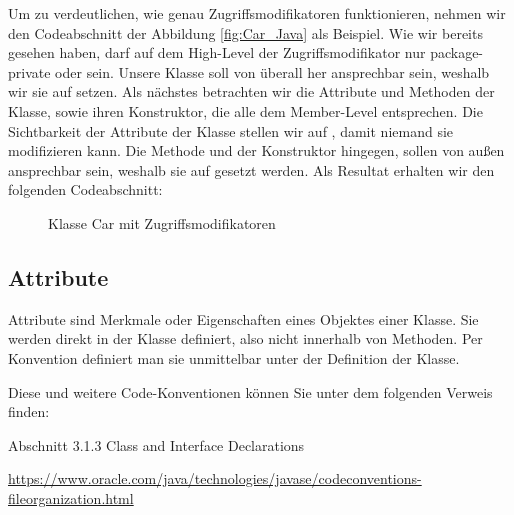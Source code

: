 \documentclass{tuda-pub}
\begin{document}

  \clearpage

  Um zu verdeutlichen, wie genau Zugriffsmodifikatoren funktionieren, nehmen wir den
  Codeabschnitt der Abbildung \ref{fig:Car_Java} als Beispiel. Wie wir bereits gesehen haben,
  darf auf dem High-Level der Zugriffsmodifikator nur package-private oder 
  sein. Unsere Klasse soll von überall her ansprechbar sein, weshalb wir sie auf
   setzen. Als nächstes betrachten wir die Attribute und Methoden der Klasse,
  sowie ihren Konstruktor, die alle dem Member-Level entsprechen. Die Sichtbarkeit der Attribute
  der Klasse  stellen wir auf , damit niemand sie
  modifizieren kann. Die Methode  und der Konstruktor hingegen,
  sollen von außen ansprechbar sein, weshalb sie auf  gesetzt werden. Als
  Resultat erhalten wir den folgenden Codeabschnitt:

  \begin{figure}[h]
    
    \caption{Klasse Car mit Zugriffsmodifikatoren}
  \end{figure}

  \clearpage

  \subsection{Attribute}
  \label{sec:Attribute}
  Attribute sind Merkmale oder Eigenschaften eines Objektes einer Klasse. Sie werden direkt in
  der Klasse definiert, also nicht innerhalb von Methoden. Per Konvention definiert man sie
  unmittelbar unter der Definition der Klasse.

  \begin{note}[title=Information:]
    Diese und weitere Code-Konventionen können Sie unter dem folgenden Verweis finden:

    \begin{center}
      Abschnitt 3.1.3 Class and Interface Declarations

      \br

      \url{https://www.oracle.com/java/technologies/javase/codeconventions-fileorganization.html}
    \end{center}
  \end{note}
\end{document}
